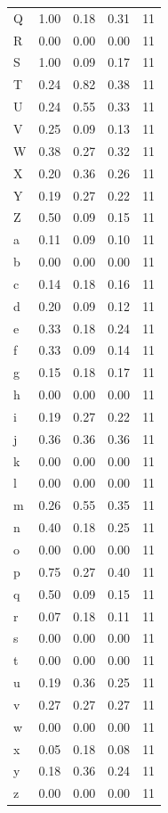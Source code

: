 \documentclass[11pt,a4paper]{article}
\begin{document}
\begin{longtable}{@{}l c c c c@{}}
Q  & 1.00 & 0.18 & 0.31 & 11 \\
R  & 0.00 & 0.00 & 0.00 & 11 \\
S  & 1.00 & 0.09 & 0.17 & 11 \\
T  & 0.24 & 0.82 & 0.38 & 11 \\
U  & 0.24 & 0.55 & 0.33 & 11 \\
V  & 0.25 & 0.09 & 0.13 & 11 \\
W  & 0.38 & 0.27 & 0.32 & 11 \\
X  & 0.20 & 0.36 & 0.26 & 11 \\
Y  & 0.19 & 0.27 & 0.22 & 11 \\
Z  & 0.50 & 0.09 & 0.15 & 11 \\
a  & 0.11 & 0.09 & 0.10 & 11 \\
b  & 0.00 & 0.00 & 0.00 & 11 \\
c  & 0.14 & 0.18 & 0.16 & 11 \\
d  & 0.20 & 0.09 & 0.12 & 11 \\
e  & 0.33 & 0.18 & 0.24 & 11 \\
f  & 0.33 & 0.09 & 0.14 & 11 \\
g  & 0.15 & 0.18 & 0.17 & 11 \\
h  & 0.00 & 0.00 & 0.00 & 11 \\
i  & 0.19 & 0.27 & 0.22 & 11 \\
j  & 0.36 & 0.36 & 0.36 & 11 \\
k  & 0.00 & 0.00 & 0.00 & 11 \\
l  & 0.00 & 0.00 & 0.00 & 11 \\
m  & 0.26 & 0.55 & 0.35 & 11 \\
n  & 0.40 & 0.18 & 0.25 & 11 \\
o  & 0.00 & 0.00 & 0.00 & 11 \\
p  & 0.75 & 0.27 & 0.40 & 11 \\
q  & 0.50 & 0.09 & 0.15 & 11 \\
r  & 0.07 & 0.18 & 0.11 & 11 \\
s  & 0.00 & 0.00 & 0.00 & 11 \\
t  & 0.00 & 0.00 & 0.00 & 11 \\
u  & 0.19 & 0.36 & 0.25 & 11 \\
v  & 0.27 & 0.27 & 0.27 & 11 \\
w  & 0.00 & 0.00 & 0.00 & 11 \\
x  & 0.05 & 0.18 & 0.08 & 11 \\
y  & 0.18 & 0.36 & 0.24 & 11 \\
z  & 0.00 & 0.00 & 0.00 & 11 \\
\end{longtable}
\normalsize
\end{document}

